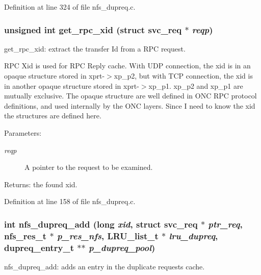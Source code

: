 Definition at line 324 of file nfs\_\-dupreq.c.
\subsubsection[{get\_\-rpc\_\-xid}]{\setlength{\rightskip}{0pt plus 5cm}unsigned int get\_\-rpc\_\-xid (struct svc\_\-req $\ast$ {\em reqp})}\label{nfs__dupreq_8c_e04d38ace0d9a143801c1625135d4ad7}


get\_\-rpc\_\-xid: extract the transfer Id from a RPC request.

RPC Xid is used for RPC Reply cache. With UDP connection, the xid is in an opaque structure stored in xprt-$>$xp\_\-p2, but with TCP connection, the xid is in another opaque structure stored in xprt-$>$xp\_\-p1. xp\_\-p2 and xp\_\-p1 are mutually exclusive. The opaque structure are well defined in ONC RPC protocol definitions, and used internally by the ONC layers. Since I need to know the xid the structures are defined here.

\begin{Desc}
\item[Parameters:]
\begin{description}
\item[{\em reqp}]A pointer to the request to be examined.\end{description}
\end{Desc}
\begin{Desc}
\item[Returns:]the found xid. \end{Desc}


Definition at line 158 of file nfs\_\-dupreq.c.
\subsubsection[{nfs\_\-dupreq\_\-add}]{\setlength{\rightskip}{0pt plus 5cm}int nfs\_\-dupreq\_\-add (long {\em xid}, \/  struct svc\_\-req $\ast$ {\em ptr\_\-req}, \/  nfs\_\-res\_\-t $\ast$ {\em p\_\-res\_\-nfs}, \/  LRU\_\-list\_\-t $\ast$ {\em lru\_\-dupreq}, \/  dupreq\_\-entry\_\-t $\ast$$\ast$ {\em p\_\-dupreq\_\-pool})}\label{nfs__dupreq_8c_72a8bca40613bd2e5a727a7274ca8e66}


nfs\_\-dupreq\_\-add: adds an entry in the duplicate requests cache.

